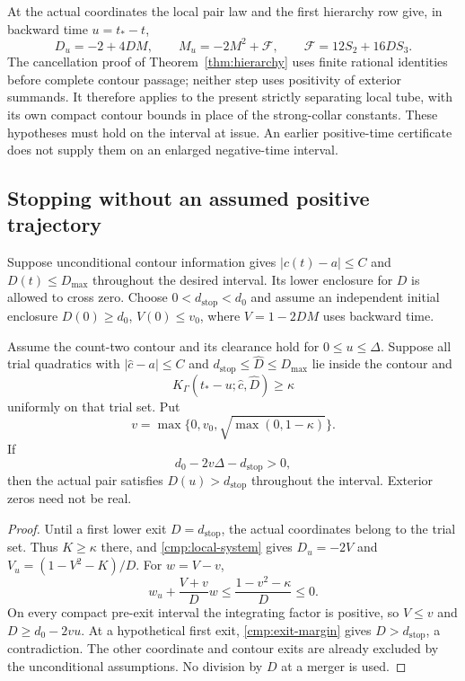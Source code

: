 At the actual coordinates the local pair law and the first hierarchy
row give, in backward time $u=t_*-t$,
\begin{equation}
 D_u=-2+4DM,\qquad M_u=-2M^2+\mathcal F,
 \qquad \mathcal F=12S_2+16DS_3.
 \label{cmp:local-system}
\end{equation}
The cancellation proof of Theorem~\ref{thm:hierarchy} uses finite rational
identities before complete contour passage; neither step uses positivity
of exterior summands. It therefore applies to the present strictly
separating local tube, with its own compact contour bounds in place of
the strong-collar constants. These hypotheses must hold on the interval
at issue. An earlier positive-time certificate does not supply them on
an enlarged negative-time interval.

\subsection{Stopping without an assumed positive trajectory}

Suppose unconditional contour information gives
$|c(t)-a|\le C$ and $D(t)\le D_{\max}$ throughout the desired interval.
Its lower enclosure for $D$ is allowed to cross zero. Choose
$0<d_{\mathrm{stop}}<d_0$ and assume an independent initial enclosure
$D(0)\ge d_0$, $V(0)\le v_0$, where $V=1-2DM$ uses backward time.

\begin{theorem}
\label{cmp:stop}
Assume the count-two contour and its clearance hold for
$0\le u\le\Delta$. Suppose all trial quadratics with
$|\widehat c-a|\le C$ and
$d_{\mathrm{stop}}\le\widehat D\le D_{\max}$ lie inside the contour and
\begin{equation}
 K_\Gamma(t_* -u;\widehat c,\widehat D)\ge\kappa
 \label{cmp:kfloor}
\end{equation}
uniformly on that trial set. Put
\[
 v=\max\{0,v_0,\sqrt{\max(0,1-\kappa)}\}.
\]
If
\begin{equation}
 d_0-2v\Delta-d_{\mathrm{stop}}>0,
 \label{cmp:exit-margin}
\end{equation}
then the actual pair satisfies $D(u)>d_{\mathrm{stop}}$ throughout the
interval. Exterior zeros need not be real.
\end{theorem}
\begin{proof}
Until a first lower exit $D=d_{\mathrm{stop}}$, the actual coordinates
belong to the trial set. Thus $K\ge\kappa$ there, and
\eqref{cmp:local-system} gives
$D_u=-2V$ and $V_u=(1-V^2-K)/D$. For $w=V-v$,
\[
 w_u+\frac{V+v}{D}w\le\frac{1-v^2-\kappa}{D}\le0.
\]
On every compact pre-exit interval the integrating factor is positive,
so $V\le v$ and $D\ge d_0-2vu$. At a hypothetical first exit,
\eqref{cmp:exit-margin} gives $D>d_{\mathrm{stop}}$, a contradiction.
The other coordinate and contour exits are already excluded by the
unconditional assumptions. No division by $D$ at a merger is used.
\end{proof}

